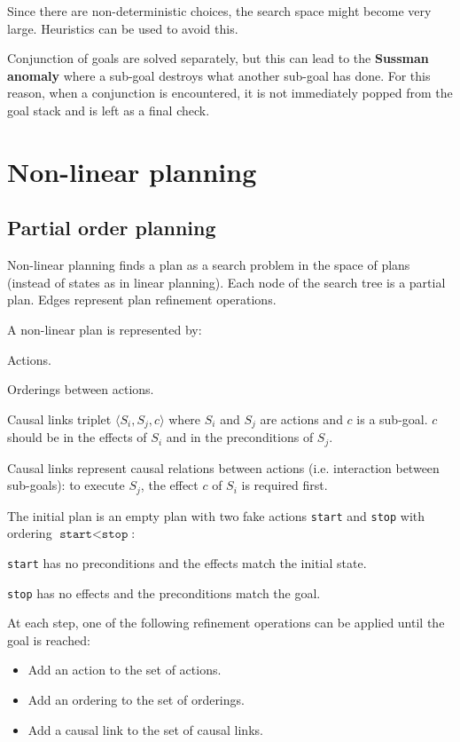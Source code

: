 Since there are non-deterministic choices, the search space might become very large.
Heuristics can be used to avoid this.

Conjunction of goals are solved separately, but this can lead to the  \textbf{Sussman anomaly} 
where a sub-goal destroys what another sub-goal has done.
For this reason, when a conjunction is encountered, it is not immediately popped from the goal stack
and is left as a final check.



\section{Non-linear planning}


\subsection{Partial order planning}

Non-linear planning finds a plan as a search problem in the space of plans (instead of states as in linear planning).
Each node of the search tree is a partial plan. Edges represent plan refinement operations.

A non-linear plan is represented by:
\begin{descriptionlist}
    \item[Actions{\normalfont.}] 
    \item[Orderings] 
        between actions.
    \item[Causal links] 
        triplet $\langle S_i, S_j, c \rangle$ where $S_i$ and $S_j$ are actions and $c$ is a sub-goal.
        $c$ should be in the effects of $S_i$ and in the preconditions of $S_j$.

        Causal links represent causal relations between actions (i.e. interaction between sub-goals): 
        to execute $S_j$, the effect $c$ of $S_i$ is required first.
\end{descriptionlist}

The initial plan is an empty plan with two fake actions \texttt{start} and \texttt{stop} 
with ordering $\texttt{start} < \texttt{stop}$:
\begin{descriptionlist}
    \item[\texttt{start}] has no preconditions and the effects match the initial state.
    \item[\texttt{stop}] has no effects and the preconditions match the goal.
\end{descriptionlist}
At each step, one of the following refinement operations can be applied until the goal is reached:
\begin{itemize}
    \item Add an action to the set of actions.
    \item Add an ordering to the set of orderings.
    \item Add a causal link to the set of causal links.
\end{itemize}

